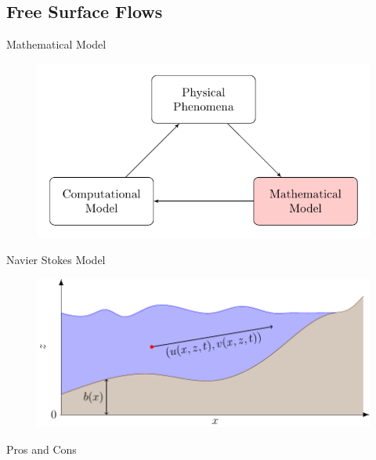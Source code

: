 \documentclass[pdf]{beamer}
\begin{document}
\subsection{Free Surface Flows}
\begin{frame}{Mathematical Model}
	\begin{figure}
		\includegraphics[width=\textwidth]{./Pics/ModelDiagrams/FlowChartHigh2.pdf}
	\end{figure}
\end{frame}
\begin{frame}{Navier Stokes Model}
	\begin{figure}
		\includegraphics[width=\textwidth]{./Pics/WaterModelDiagrams/NavierStokes.pdf}
	\end{figure}
\end{frame}
\begin{frame}{Pros and Cons}
\end{frame}
\end{document}
